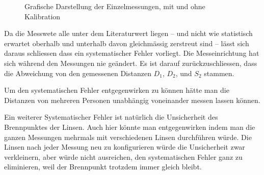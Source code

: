 \begin{figure}[ht!]
    \centering
    \caption{Grafische Darstellung der Einzelmessungen, mit und ohne Kalibration}
    \label{fig:einzelmessungen}
\end{figure}

Da die Messwete alle unter dem Literaturwert liegen -- und nicht wie statistisch
erwartet oberhalb und unterhalb davon gleichm\"assig  zerstreut  sind -- l\"asst
sich  daraus   schliessen   dass   ein   systematischer   Fehler  vorliegt.  Die
Messeinrichtung  hat sich w\"ahrend den Messungen nie ge\"andert. Es ist  darauf
zur\"uckzuschliessen, dass die  Abweichung  von  den gemessenen Distanzen $D_1$,
$D_2$, und $S_2$ stammen.

Um  den  systematischen  Fehler  entgegenwirken  zu  k\"onnen  h\"atte  man  die
Distanzen von mehreren Personen unabh\"angig voneinander messen lassen k\"onnen.

Ein  weiterer  Systematischer  Fehler  ist  nat\"urlich   die  Unsicherheit  des
Brennpunktes der Linsen. Auch hier k\"onnte  man  entgegenwirken  indem  man die
ganzen  Messungen  mehrmals  mit  verschiedenen  Linsen  durchf\"uhren  w\"urde.
Die Linsen nach jeder Messung neu zu konfigurieren w\"urde die Unsicherheit zwar
verkleinern,  aber  w\"urde nicht ausreichen, den systematischen Fehler ganz  zu
eliminieren, weil der Brennpunkt trotzdem immer gleich bleibt.

